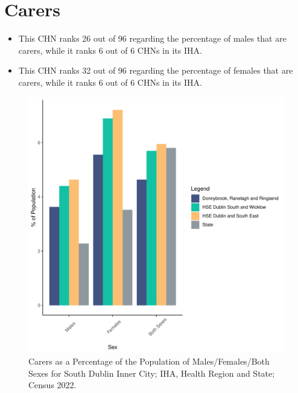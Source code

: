 \documentclass{article}
\begin{document}
\section{Carers}\label{sect:Carers}
\begin{itemize}
\item This CHN ranks  26 out of 96 regarding the percentage of males that are carers, while it ranks   6 out of 6 CHNs in its IHA.
\item This CHN ranks  32 out of 96 regarding the percentage of females that are carers, while it ranks   6 out of 6 CHNs in its IHA.
\end{itemize}
\begin{figure}[H]
	\centering
	\includegraphics[width = 150mm]{../figures/CareED.pdf}
	\caption{Carers as a Percentage of the Population of Males/Females/Both Sexes for South Dublin Inner City; IHA, Health Region and State; Census 2022.}
	\label{fig:2ae19629-1a6a-13a3-e055-000000000001}
	\end{figure}
\end{document}
